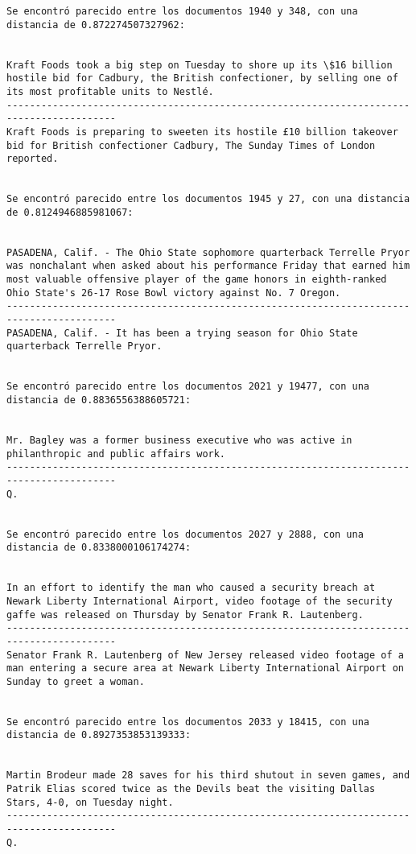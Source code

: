 \documentclass[11pt]{article}
\begin{document}
\begin{Verbatim}[commandchars=\\\{\}]
Se encontró parecido entre los documentos 1940 y 348, con una distancia de 0.872274507327962:


Kraft Foods took a big step on Tuesday to shore up its \$16 billion hostile bid for Cadbury, the British confectioner, by selling one of its most profitable units to Nestlé.
-----------------------------------------------------------------------------------------
Kraft Foods is preparing to sweeten its hostile £10 billion takeover bid for British confectioner Cadbury, The Sunday Times of London reported.


Se encontró parecido entre los documentos 1945 y 27, con una distancia de 0.8124946885981067:


PASADENA, Calif. - The Ohio State sophomore quarterback Terrelle Pryor was nonchalant when asked about his performance Friday that earned him most valuable offensive player of the game honors in eighth-ranked Ohio State's 26-17 Rose Bowl victory against No. 7 Oregon.
-----------------------------------------------------------------------------------------
PASADENA, Calif. - It has been a trying season for Ohio State quarterback Terrelle Pryor.


Se encontró parecido entre los documentos 2021 y 19477, con una distancia de 0.8836556388605721:


Mr. Bagley was a former business executive who was active in philanthropic and public affairs work.
-----------------------------------------------------------------------------------------
Q.


Se encontró parecido entre los documentos 2027 y 2888, con una distancia de 0.8338000106174274:


In an effort to identify the man who caused a security breach at Newark Liberty International Airport, video footage of the security gaffe was released on Thursday by Senator Frank R. Lautenberg.
-----------------------------------------------------------------------------------------
Senator Frank R. Lautenberg of New Jersey released video footage of a man entering a secure area at Newark Liberty International Airport on Sunday to greet a woman.


Se encontró parecido entre los documentos 2033 y 18415, con una distancia de 0.8927353853139333:


Martin Brodeur made 28 saves for his third shutout in seven games, and Patrik Elias scored twice as the Devils beat the visiting Dallas Stars, 4-0, on Tuesday night.
-----------------------------------------------------------------------------------------
Q.



\end{Verbatim}
\end{document}
